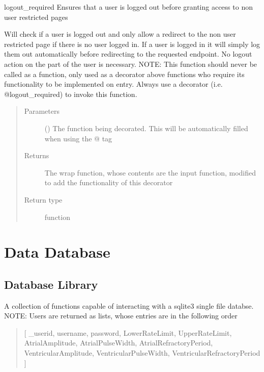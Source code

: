 \documentclass[letterpaper,10pt,english]{sphinxmanual}
\begin{document}
\begin{fulllineitems}
\label{\detokenize{index:config.decorators.logout_required}}
logout\_required Ensures that a user is logged out before granting access to non user restricted pages

Will check if a user is logged out and only allow a redirect to the non user restricted page if there is
no user logged in. If a user is logged in it will simply log them out automatically before redirecting to
the requested endpoint. No logout action on the part of the user is necessary.
NOTE: This function should never be called as a function, only used as a decorator above functions
who require its functionality to be implemented on entry. Always use a decorator (i.e. @logout\_required)
to invoke this function.
\begin{quote}\begin{description}
\item[{Parameters}] \leavevmode
{} () \textendash{} The function being decorated. This will be automatically filled when using the @ tag

\item[{Returns}] \leavevmode
The wrap function, whose contents are the input function, modified to add the functionality of this decorator

\item[{Return type}] \leavevmode
function

\end{description}\end{quote}

\end{fulllineitems}



\chapter{Data Database}
\label{\detokenize{index:module-data.database}}\label{\detokenize{index:data-database}}

\section{Database Library}
\label{\detokenize{index:database-library}}
A collection of functions capable of interacting with
a sqlite3 single file databse.
NOTE: Users are returned as lists, whose entries are
in the following order
\begin{quote}

{[} \_userid,
username,
password,
LowerRateLimit,
UpperRateLimit,
AtrialAmplitude,
AtrialPulseWidth,
AtrialRefractoryPeriod,
VentricularAmplitude,
VentricularPulseWidth,
VentricularRefractoryPeriod {]}
\end{quote}
\end{document}
